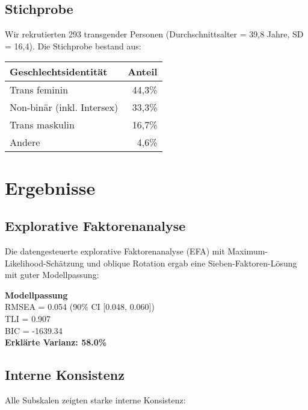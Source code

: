 \documentclass[11pt,a4paper]{article}
\begin{document}
\subsection{Stichprobe}

Wir rekrutierten 293 transgender Personen (Durchschnittsalter = 39,8 Jahre, SD = 16,4). Die Stichprobe bestand aus:

\begin{center}
\begin{tabular}{lr}
\toprule
\textbf{Geschlechtsidentität} & \textbf{Anteil} \\
\midrule
Trans feminin & 44,3\% \\
Non-binär (inkl. Intersex) & 33,3\% \\
Trans maskulin & 16,7\% \\
Andere & 4,6\% \\
\bottomrule
\end{tabular}
\end{center}

\section{Ergebnisse}

\subsection{Explorative Faktorenanalyse}

Die datengesteuerte explorative Faktorenanalyse (EFA) mit Maximum-Likelihood-Schätzung und oblique Rotation ergab eine Sieben-Faktoren-Lösung mit guter Modellpassung:

\begin{center}
\begin{tcolorbox}[colback=lightgray,colframe=darkblue,width=0.7\textwidth,arc=3mm]
\centering
\textbf{Modellpassung}\\[0.3cm]
RMSEA = 0.054 (90\% CI [0.048, 0.060])\\
TLI = 0.907\\
BIC = -1639.34\\[0.2cm]
\textbf{Erklärte Varianz: 58.0\%}
\end{tcolorbox}
\end{center}

\subsection{Interne Konsistenz}

Alle Subskalen zeigten starke interne Konsistenz:
\end{document}
